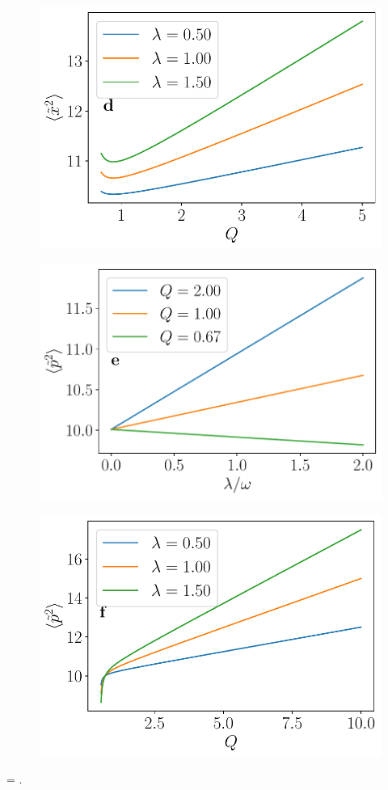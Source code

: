 \hfill
\begin{subfigure}[t]{0.48\textwidth}
    \includegraphics[width=\textwidth]{figures/x2_vs_Q}
\end{subfigure}
\begin{subfigure}[t]{0.48\textwidth}
    \includegraphics[width=\textwidth]{figures/p2_vs_lambda}
\end{subfigure}
\hfill
\begin{subfigure}[t]{0.48\textwidth}
    \includegraphics[width=\textwidth]{figures/p2_vs_Q}
\end{subfigure}

\varepsilon\pm = .